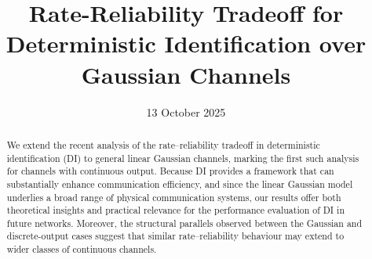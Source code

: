 \documentclass[10pt,conference]{IEEEtran}
\newcommand{\1}{\mathds{1}}
\begin{document}
\title{Rate-Reliability Tradeoff for Deterministic Identification over Gaussian Channels}

\author{
\and
{}
\and
{}
\and
{}
}

\date{13 October 2025} 

\maketitle

\pagestyle{plain}


\begin{abstract}
We extend the recent analysis of the rate–reliability tradeoff in deterministic identification (DI) to general linear Gaussian channels, marking the first such analysis for channels with continuous output. 
Because DI provides a framework that can substantially enhance communication efficiency, and since the linear Gaussian model underlies a broad range of physical communication systems, our results offer both theoretical insights and practical relevance for the performance evaluation of DI in future networks. Moreover, the structural parallels observed between the Gaussian and discrete-output cases suggest that similar rate–reliability behaviour may extend to wider classes of continuous channels.
\end{abstract}
\end{document}
